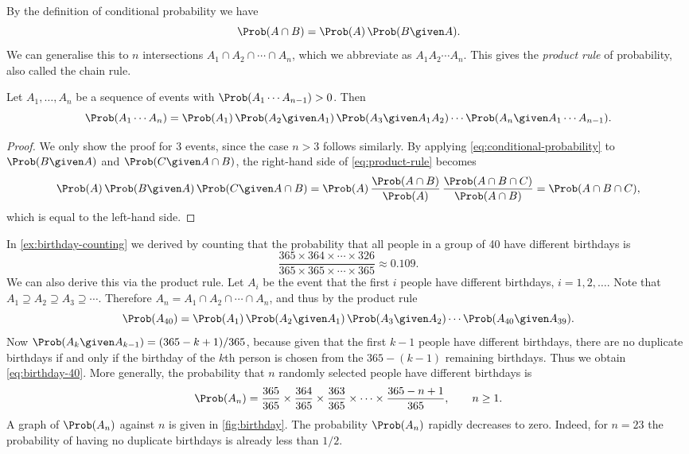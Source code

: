 By the definition of conditional probability we have
\begin{equation}\label{eq:product-rule-two}
  \Prob(A \cap B) = \Prob(A)\,\Prob(B \given A).
\end{equation}
We can generalise this to $n$ intersections $A_1 \cap A_2 \cap \cdots \cap A_n$, which we abbreviate as $A_1 A_2 \cdots A_n$. This gives the \emph{product rule} of probability, also called the chain rule.

\begin{theorem}\label{thm:product-rule}
Let $A_1, \ldots, A_n$ be a sequence of events with $\Prob(A_1 \cdots A_{n-1}) > 0$. Then
\begin{equation}\label{eq:product-rule}
  \Prob(A_1 \cdots A_n) = \Prob(A_1)\,\Prob(A_2 \given A_1)\,\Prob(A_3 \given A_1 A_2) \cdots \Prob(A_n \given A_1 \cdots A_{n-1}).
\end{equation}
\end{theorem}

\begin{proof}
We only show the proof for 3 events, since the case $n > 3$ follows similarly. By applying \eqref{eq:conditional-probability} to $\Prob(B \given A)$ and $\Prob(C \given A \cap B)$, the right-hand side of \eqref{eq:product-rule} becomes
\[
  \Prob(A)\,\Prob(B \given A)\,\Prob(C \given A \cap B) = \Prob(A)\,\frac{\Prob(A \cap B)}{\Prob(A)}\,\frac{\Prob(A \cap B \cap C)}{\Prob(A \cap B)} = \Prob(A \cap B \cap C),
\]
which is equal to the left-hand side.
\end{proof}

\begin{example}\label{ex:birthday-product-rule}
In \cref{ex:birthday-counting} we derived by counting that the probability that all people in a group of 40 have different birthdays is
\begin{equation}\label{eq:birthday-40}
  \frac{365 \times 364 \times \cdots \times 326}{365 \times 365 \times \cdots \times 365} \approx 0.109.
\end{equation}
We can also derive this via the product rule. Let $A_i$ be the event that the first $i$ people have different birthdays, $i = 1, 2, \ldots$. Note that $A_1 \supseteq A_2 \supseteq A_3 \supseteq \cdots$. Therefore $A_n = A_1 \cap A_2 \cap \cdots \cap A_n$, and thus by the product rule
\[
  \Prob(A_{40}) = \Prob(A_1)\,\Prob(A_2 \given A_1)\,\Prob(A_3 \given A_2) \cdots \Prob(A_{40} \given A_{39}).
\]
Now $\Prob(A_k \given A_{k-1}) = (365 - k + 1)/365$, because given that the first $k - 1$ people have different birthdays, there are no duplicate birthdays if and only if the birthday of the $k$th person is chosen from the $365 - (k - 1)$ remaining birthdays. Thus we obtain \eqref{eq:birthday-40}. More generally, the probability that $n$ randomly selected people have different birthdays is
\[
  \Prob(A_n) = \frac{365}{365} \times \frac{364}{365} \times \frac{363}{365} \times \cdots \times \frac{365 - n + 1}{365}, \qquad n \ge 1.
\]
A graph of $\Prob(A_n)$ against $n$ is given in \cref{fig:birthday}. The probability $\Prob(A_n)$ rapidly decreases to zero. Indeed, for $n = 23$ the probability of having no duplicate birthdays is already less than $1/2$.
\end{example}

